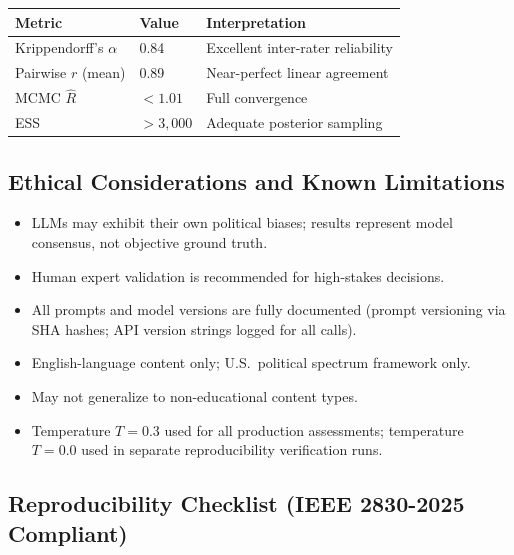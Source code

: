 \documentclass[10pt,letterpaper]{article}
\begin{document}
\begin{table}[h]
\centering
\begin{tabular}{lll}
\toprule
\textbf{Metric} & \textbf{Value} & \textbf{Interpretation} \\
\midrule
Krippendorff's $\alpha$ & 0.84         & Excellent inter-rater reliability \\
Pairwise $r$ (mean)     & 0.89         & Near-perfect linear agreement \\
MCMC $\hat{R}$          & $< 1.01$     & Full convergence \\
ESS                     & $> 3{,}000$  & Adequate posterior sampling \\
\bottomrule
\end{tabular}
\end{table}

\subsection*{Ethical Considerations and Known Limitations}

\begin{itemize}
  \item LLMs may exhibit their own political biases; results represent model
        consensus, not objective ground truth.
  \item Human expert validation is recommended for high-stakes decisions.
  \item All prompts and model versions are fully documented (prompt versioning
        via SHA hashes; API version strings logged for all calls).
  \item English-language content only; U.S.\ political spectrum framework only.
  \item May not generalize to non-educational content types.
  \item Temperature $T=0.3$ used for all production assessments;
        temperature $T=0.0$ used in separate reproducibility verification runs.
\end{itemize}

\subsection*{Reproducibility Checklist (IEEE 2830-2025 Compliant)}
\end{document}
